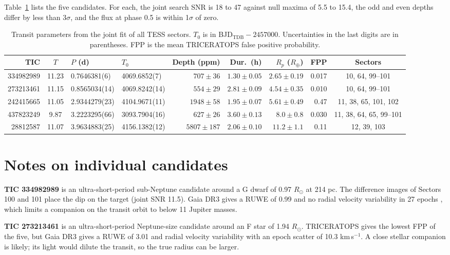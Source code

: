 \documentclass{aastex701}
\begin{document}
Table~\ref{tab:candidates} lists the five candidates. For each, the joint search SNR is 18 to 47 against null maxima
of 5.5 to 15.4, the odd and even depths differ by less than 3$\sigma$, and the flux at phase 0.5 is within
1$\sigma$ of zero.

\begin{table}[ht!]
\centering
\caption{Transit parameters from the joint fit of all TESS sectors. $T_0$ is in BJD$_\mathrm{TDB} - 2457000$.
Uncertainties in the last digits are in parentheses. FPP is the mean TRICERATOPS false positive probability.
\label{tab:candidates}}
\begin{tabular}{rcllrrrrc}
\hline
TIC & $T$ & $P$ (d) & $T_0$ & Depth (ppm) & Dur.\ (h) & $R_p$ ($R_\oplus$) & FPP & Sectors \\
\hline
334982989 & 11.23 & 0.7646381(6) & 4069.6852(7) & $707\pm36$ & $1.30\pm0.05$ & $2.65\pm0.19$ & 0.017 & 10, 64, 99--101 \\
273213461 & 11.15 & 0.8565034(14) & 4069.8242(14) & $554\pm29$ & $2.81\pm0.09$ & $4.54\pm0.35$ & 0.010 & 10, 64, 99--101 \\
242415665 & 11.05 & 2.9344279(23) & 4104.9671(11) & $1948\pm58$ & $1.95\pm0.07$ & $5.61\pm0.49$ & 0.47 & 11, 38, 65, 101, 102 \\
437823249 & 9.87 & 3.2223295(66) & 3093.7904(16) & $627\pm26$ & $3.60\pm0.13$ & $8.0\pm0.8$ & 0.030 & 11, 38, 64, 65, 99--101 \\
28812587 & 11.07 & 3.9634883(25) & 4156.1382(12) & $5807\pm187$ & $2.06\pm0.10$ & $11.2\pm1.1$ & 0.11 & 12, 39, 103 \\
\hline
\end{tabular}
\end{table}

\section{Notes on individual candidates}

\textbf{TIC 334982989} is an ultra-short-period sub-Neptune candidate around a G dwarf of 0.97 $R_\odot$ at 214 pc.
The difference images of Sectors 100 and 101 place the dip on the target (joint SNR 11.5). Gaia DR3 gives a RUWE
of 0.99 and no radial velocity variability in 27 epochs \citep{katz2023}, which limits a companion on the transit
orbit to below 11 Jupiter masses.

\textbf{TIC 273213461} is an ultra-short-period Neptune-size candidate around an F star of 1.94 $R_\odot$.
TRICERATOPS gives the lowest FPP of the five, but Gaia DR3 gives a RUWE of 3.01 and radial velocity variability with
an epoch scatter of 10.3 km\,s$^{-1}$. A close stellar companion is likely; its light would dilute the transit, so
the true radius can be larger.
\end{document}
